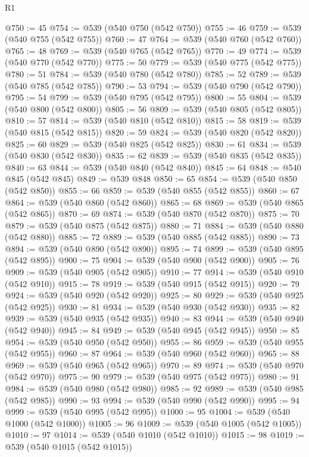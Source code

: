 \begin{lexlean}{R1}
\begin{coremodule}
@750 := 45
@754 := @539 (@540 @750 (@542 @750))
@755 := 46
@759 := @539 (@540 @755 (@542 @755))
@760 := 47
@764 := @539 (@540 @760 (@542 @760))
@765 := 48
@769 := @539 (@540 @765 (@542 @765))
@770 := 49
@774 := @539 (@540 @770 (@542 @770))
@775 := 50
@779 := @539 (@540 @775 (@542 @775))
@780 := 51
@784 := @539 (@540 @780 (@542 @780))
@785 := 52
@789 := @539 (@540 @785 (@542 @785))
@790 := 53
@794 := @539 (@540 @790 (@542 @790))
@795 := 54
@799 := @539 (@540 @795 (@542 @795))
@800 := 55
@804 := @539 (@540 @800 (@542 @800))
@805 := 56
@809 := @539 (@540 @805 (@542 @805))
@810 := 57
@814 := @539 (@540 @810 (@542 @810))
@815 := 58
@819 := @539 (@540 @815 (@542 @815))
@820 := 59
@824 := @539 (@540 @820 (@542 @820))
@825 := 60
@829 := @539 (@540 @825 (@542 @825))
@830 := 61
@834 := @539 (@540 @830 (@542 @830))
@835 := 62
@839 := @539 (@540 @835 (@542 @835))
@840 := 63
@844 := @539 (@540 @840 (@542 @840))
@845 := 64
@848 := @540 @845 (@542 @845)
@849 := @539 @848
@850 := 65
@854 := @539 (@540 @850 (@542 @850))
@855 := 66
@859 := @539 (@540 @855 (@542 @855))
@860 := 67
@864 := @539 (@540 @860 (@542 @860))
@865 := 68
@869 := @539 (@540 @865 (@542 @865))
@870 := 69
@874 := @539 (@540 @870 (@542 @870))
@875 := 70
@879 := @539 (@540 @875 (@542 @875))
@880 := 71
@884 := @539 (@540 @880 (@542 @880))
@885 := 72
@889 := @539 (@540 @885 (@542 @885))
@890 := 73
@894 := @539 (@540 @890 (@542 @890))
@895 := 74
@899 := @539 (@540 @895 (@542 @895))
@900 := 75
@904 := @539 (@540 @900 (@542 @900))
@905 := 76
@909 := @539 (@540 @905 (@542 @905))
@910 := 77
@914 := @539 (@540 @910 (@542 @910))
@915 := 78
@919 := @539 (@540 @915 (@542 @915))
@920 := 79
@924 := @539 (@540 @920 (@542 @920))
@925 := 80
@929 := @539 (@540 @925 (@542 @925))
@930 := 81
@934 := @539 (@540 @930 (@542 @930))
@935 := 82
@939 := @539 (@540 @935 (@542 @935))
@940 := 83
@944 := @539 (@540 @940 (@542 @940))
@945 := 84
@949 := @539 (@540 @945 (@542 @945))
@950 := 85
@954 := @539 (@540 @950 (@542 @950))
@955 := 86
@959 := @539 (@540 @955 (@542 @955))
@960 := 87
@964 := @539 (@540 @960 (@542 @960))
@965 := 88
@969 := @539 (@540 @965 (@542 @965))
@970 := 89
@974 := @539 (@540 @970 (@542 @970))
@975 := 90
@979 := @539 (@540 @975 (@542 @975))
@980 := 91
@984 := @539 (@540 @980 (@542 @980))
@985 := 92
@989 := @539 (@540 @985 (@542 @985))
@990 := 93
@994 := @539 (@540 @990 (@542 @990))
@995 := 94
@999 := @539 (@540 @995 (@542 @995))
@1000 := 95
@1004 := @539 (@540 @1000 (@542 @1000))
@1005 := 96
@1009 := @539 (@540 @1005 (@542 @1005))
@1010 := 97
@1014 := @539 (@540 @1010 (@542 @1010))
@1015 := 98
@1019 := @539 (@540 @1015 (@542 @1015))

\end{coremodule}
\end{lexlean}
